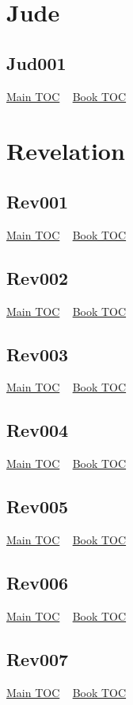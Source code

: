 \documentclass{book}
\begin{document}
  \chapter{Jude} \label{subsec:Jud} \begin{multicols}{2} \minitoc \end{multicols}
  \section{Jud001}\hyperlink{toc}{Main TOC} ~ \hyperref[subsec:Jud]{Book TOC} 
  \chapter{Revelation} \label{subsec:Rev} \begin{multicols}{2} \minitoc \end{multicols}
  \section{Rev001}\hyperlink{toc}{Main TOC} ~ \hyperref[subsec:Rev]{Book TOC} 
  \section{Rev002}\hyperlink{toc}{Main TOC} ~ \hyperref[subsec:Rev]{Book TOC} 
  \section{Rev003}\hyperlink{toc}{Main TOC} ~ \hyperref[subsec:Rev]{Book TOC} 
  \section{Rev004}\hyperlink{toc}{Main TOC} ~ \hyperref[subsec:Rev]{Book TOC} 
  \section{Rev005}\hyperlink{toc}{Main TOC} ~ \hyperref[subsec:Rev]{Book TOC} 
  \section{Rev006}\hyperlink{toc}{Main TOC} ~ \hyperref[subsec:Rev]{Book TOC} 
  \section{Rev007}\hyperlink{toc}{Main TOC} ~ \hyperref[subsec:Rev]{Book TOC} 
\end{document}
